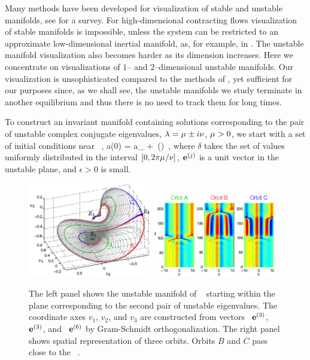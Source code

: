 Many methods have been developed for visualization of stable
and unstable manifolds, see 
for a survey. For high-dimensional contracting flows
visualization of stable manifolds is impossible, unless the
system can be restricted to an approximate  low-dimensional
inertial manifold, as, for example, in . The unstable
manifold visualization also becomes harder as its dimension
increases. Here we concentrate on visualizations of $1$-- and
$2$--dimensional unstable manifolds. Our visualization is
unsophisticated compared to the methods of
, yet sufficient for our
purposes since, as we shall see, the unstable manifolds we
study terminate in another equilibrium and thus there is no
need to track them for long times.


To construct an invariant manifold containing solutions
corresponding to the pair of unstable complex conjugate eigenvalues,
$\lambda_{ } = \mu_{ } \pm i\nu_{ }$,
$\mu_{ } > 0$, we start with a set of
initial conditions near \eqv\ ,
\beq
  a(0) = a_{{}} + \epsilon\,\exp(\delta)
\,,
where $\delta$ takes the set of values uniformly distributed in the
interval $[0,2\pi\mu_{ }/\nu_{ }]$, ${\mathbf e}^{(j)}$ is a unit vector in the
unstable plane, and $\epsilon > 0$ is small.

\begin{figure}[t]
\begin{center}
\includegraphics[width=0.48\textwidth, clip=true]{figs_bmp/ks22_E1_plane2_manifold_c.eps}
\includegraphics[width=0.48\textwidth, clip=true]{figs_bmp/ks22_E1_plane2_orbits_c.eps}
\end{center}
\caption{
The left panel shows the unstable
manifold of \eqv\  starting within the plane
corresponding to the second pair of unstable eigenvalues. The
coordinate axes $v_1$, $v_2$, and $v_3$ are constructed from vectors
\Re\, ${\mathbf e}^{(3)}$, \Im\, ${\mathbf e}^{(3)}$, and \Re\, ${\mathbf e}^{(6)}$
by Gram-Schmidt orthogonalization.
The right panel shows spatial representation of three orbits. Orbits
$B$ and $C$ pass close to the \eqv\ .
   }
\label{f:KS22E1man2}
\end{figure}


